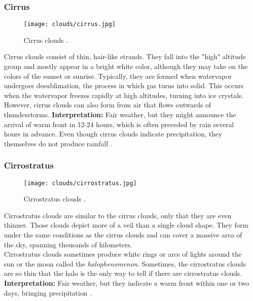 
\pagebreak

\subsubsection{Cirrus}
\begin{wrapfigure}[10]{r}{6cm}
    \vspace{-\baselineskip}
    \texttt{[image: clouds/cirrus.jpg]}
    \caption{Cirrus clouds \protect\cite{cloudtypes:wiki:cirrus}.}
    \label{img:clouds:cirrus}
\end{wrapfigure}
Cirrus clouds consist of thin, hair-like strands.
They fall into the "high" altitude group and mostly appear in a bright white color, although they may take on the colors of the sunset or sunrise.
Typically, they are formed when \gls{watervapor} undergoes \gls{desublimation}, the process in which gas turns into solid. This occurs when the \gls{watervapor} freezes rapidly at high altitudes, turning into ice crystals.
\\
\noindent
However, cirrus clouds can also form from air that flows outwards of thunderstorms.
\emptyline
\textbf{Interpretation:} Fair weather, but they might announce the arrival of warm front in 12-24 hours, which is often preceded by rain several hours in advance.
Even though cirrus clouds indicate \gls{precipitation}, they themselves do not produce rainfall \cite{predict:weather}.

\subsubsection{Cirrostratus}
\begin{wrapfigure}[10]{r}{6cm}
    \vspace{-\baselineskip}
    \texttt{[image: clouds/cirrostratus.jpg]}
    \caption{Cirrostratus clouds \protect\cite{cloudtypes:wiki:cirrostratus}.}
    \label{img:clouds:cirrostratus}
\end{wrapfigure}
Cirrostratus clouds are similar to the cirrus clouds, only that they are even thinner.
Those clouds depict more of a veil than a single cloud shape.
They form under the same conditions as the cirrus clouds and can cover a massive area of the sky, spanning thousands of kilometers.
\\
\noindent
Cirrostratus clouds sometimes produce white rings or arcs of lights around the sun or the moon called the \emph{\gls{halophenomenon}}.
Sometimes, the cirrostratus clouds are so thin that the halo is the only way to tell if there are cirrostratus clouds.
\emptyline
\textbf{Interpretation:} Fair weather, but they indicate a warm front within one or two days, bringing \gls{precipitation} \cite{cloudtypes:meteoblue}.

